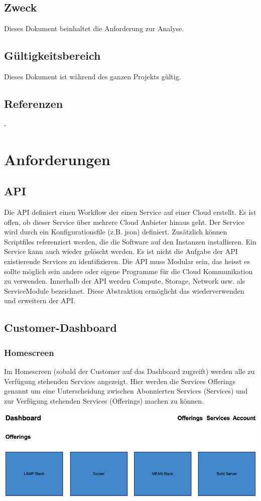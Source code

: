 \documentclass[11pt]{scrartcl}
\begin{document}
\subsection{Zweck}
Dieses Dokument beinhaltet die Anforderung zur Analyse.
\subsection{Gültigkeitsbereich}
Dieses Dokument ist während des ganzen Projekts gültig.


\subsection{Referenzen}
-

\section{Anforderungen}
\subsection{API}
Die API definiert einen Workflow der einen Service auf einer Cloud erstellt. Es ist offen, ob 
dieser Service über mehrere Cloud Anbieter hinaus geht. Der Service wird durch 
ein Konfigurationsfile (z.B. json) definiert. Zusätzlich können Scriptfiles referenziert werden, 
die die Software auf den Instanzen installieren. Ein Service kann auch wieder gelöscht werden.
 Es ist nicht die Aufgabe der API existierende Services zu identifizieren. 
 Die API muss Modular sein, das heisst es sollte möglich sein andere oder eigene 
 Programme für die Cloud Kommunikation zu verwenden. Innerhalb der API 
 werden Compute, Storage, Network usw. als ServiceModule bezeichnet. 
 Diese Abstraktion ermöglicht das wiederverwenden und erweitern der API.
\newpage
\subsection{Customer-Dashboard}
\subsubsection{Homescreen}
Im Homescreen (sobald der Customer auf das Dashboard zugreift) werden alle zu 
Verfügung stehenden Services angezeigt.
Hier werden die Services Offerings genannt um eine Unterscheidung zwischen 
Abonnierten Services (Services) und zur Verfügung stehenden Services (Offerings) 
machen zu können.

\includegraphics[width=\textwidth]{homescreen_customer}
\end{document}
